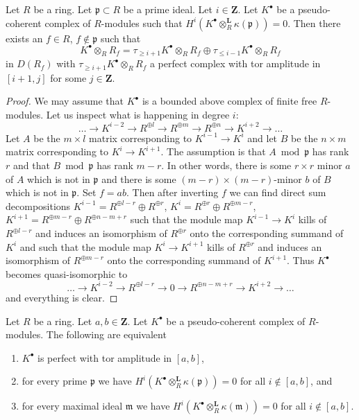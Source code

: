\begin{lemma}
\label{lemma-cut-complex-in-two}
Let $R$ be a ring. Let $\mathfrak p \subset R$ be a prime ideal.
Let $i \in \mathbf{Z}$. Let $K^\bullet$ be a pseudo-coherent complex
of $R$-modules such that
$H^i(K^\bullet \otimes_R^{\mathbf{L}} \kappa(\mathfrak p)) = 0$.
Then there exists an $f \in R$, $f \not \in \mathfrak p$ such that
$$
K^\bullet \otimes_R R_f =
\tau_{\geq i + 1}K^\bullet \otimes_R R_f \oplus
\tau_{\leq i - 1}K^\bullet \otimes_R R_f
$$
in $D(R_f)$ with $\tau_{\geq i + 1}K^\bullet \otimes_R R_f$ a perfect
complex with tor amplitude in $[i + 1, j]$ for some $j \in \mathbf{Z}$.
\end{lemma}

\begin{proof}
We may assume that $K^\bullet$ is a bounded above
complex of finite free $R$-modules. Let us inspect what is happening
in degree $i$:
$$
\ldots \to K^{i - 2} \to R^{\oplus l}
\to R^{\oplus m} \to R^{\oplus n} \to K^{i + 2} \to \ldots
$$
Let $A$ be the $m \times l$ matrix corresponding to $K^{i - 1} \to K^i$
and let $B$ be the $n \times m$ matrix corresponding to $K^i \to K^{i + 1}$.
The assumption is that $A \bmod \mathfrak p$ has rank $r$ and that
$B \bmod \mathfrak p$ has rank $m - r$. In other words, there is some
$r \times r$ minor $a$ of $A$ which is not in $\mathfrak p$ and there is
some $(m - r) \times (m - r)$-minor $b$ of $B$ which is not in $\mathfrak p$.
Set $f = ab$. Then after inverting $f$ we can find direct sum decompositions
$K^{i - 1} = R^{\oplus l - r} \oplus R^{\oplus r}$,
$K^i = R^{\oplus r} \oplus R^{\oplus m - r}$,
$K^{i + 1} = R^{\oplus m - r} \oplus R^{\oplus n - m + r}$
such that the module map $K^{i - 1} \to K^i$ kills of
$R^{\oplus l - r}$ and induces an isomorphism of $R^{\oplus r}$ onto the
corresponding summand of $K^i$ and such that the module map $K^i \to K^{i + 1}$
kills of $R^{\oplus r}$ and induces an isomorphism of $R^{\oplus m - r}$
onto the corresponding summand of $K^{i + 1}$. Thus $K^\bullet$ becomes
quasi-isomorphic to
$$
\ldots \to K^{i - 2} \to R^{\oplus l - r}
\to 0 \to R^{\oplus n - m + r} \to K^{i + 2} \to \ldots
$$
and everything is clear.
\end{proof}

\begin{lemma}
\label{lemma-check-perfect-pointwise}
Let $R$ be a ring. Let $a, b \in \mathbf{Z}$.
Let $K^\bullet$ be a pseudo-coherent complex of $R$-modules.
The following are equivalent
\begin{enumerate}
\item $K^\bullet$ is perfect with tor amplitude in $[a, b]$,
\item for every prime $\mathfrak p$ we have
$H^i(K^\bullet \otimes_R^{\mathbf{L}} \kappa(\mathfrak p)) = 0$ for all
$i \not \in [a, b]$, and
\item for every maximal ideal $\mathfrak m$ we have
$H^i(K^\bullet \otimes_R^{\mathbf{L}} \kappa(\mathfrak m)) = 0$ for all
$i \not \in [a, b]$.
\end{enumerate}
\end{lemma}

